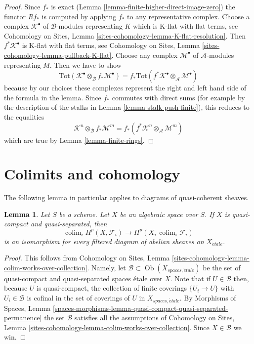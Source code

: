 \documentclass{stacks-project}
\theoremstyle{plain}
\newtheorem{lemma}[subsection]{Lemma}
\theoremstyle{definition}
\theoremstyle{remark}
\numberwithin{equation}{subsection}
\def\colim{\mathop{\mathrm{colim}}\nolimits}
\def\Ob{\mathop{\mathrm{Ob}}\nolimits}
\def\etale{{\acute{e}tale}}
\begin{document}
\begin{proof}
Since $f_*$ is exact (Lemma \ref{lemma-finite-higher-direct-image-zero})
the functor $Rf_*$ is computed by applying $f_*$ to any representative complex.
Choose a complex $\mathcal{K}^\bullet$ of $\mathcal{B}$-modules
representing $K$ which is K-flat with flat terms, see
Cohomology on Sites, Lemma \ref{sites-cohomology-lemma-K-flat-resolution}.
Then $f^*\mathcal{K}^\bullet$ is K-flat with flat terms, see
Cohomology on Sites, Lemma \ref{sites-cohomology-lemma-pullback-K-flat}.
Choose any complex $\mathcal{M}^\bullet$ of $\mathcal{A}$-modules
representing $M$. Then
we have to show
$$
\text{Tot}(\mathcal{K}^\bullet \otimes_\mathcal{B} f_*\mathcal{M}^\bullet)
=
f_*\text{Tot}(f^*\mathcal{K}^\bullet \otimes_\mathcal{A} \mathcal{M}^\bullet)
$$
because by our choices these complexes represent the right and left hand
side of the formula in the lemma.
Since $f_*$ commutes with direct sums
(for example by the description of the stalks in
Lemma \ref{lemma-stalk-push-finite}),
this reduces to the equalities
$$
\mathcal{K}^n \otimes_\mathcal{B} f_*\mathcal{M}^m
=
f_*(f^*\mathcal{K}^n \otimes_\mathcal{A} \mathcal{M}^m)
$$
which are true by Lemma \ref{lemma-finite-rings}.
\end{proof}









\section{Colimits and cohomology}
\label{section-colimits}

\noindent
The following lemma in particular applies to diagrams of quasi-coherent
sheaves.

\begin{lemma}
\label{lemma-colimits}
Let $S$ be a scheme. Let $X$ be an algebraic space over $S$.
If $X$ is quasi-compact and quasi-separated, then
$$
\colim_i H^p(X, \mathcal{F}_i)
\longrightarrow
H^p(X, \colim_i \mathcal{F}_i)
$$
is an isomorphism
for every filtered diagram of abelian sheaves on $X_\etale$.
\end{lemma}

\begin{proof}
This follows from
Cohomology on Sites, Lemma
\ref{sites-cohomology-lemma-colim-works-over-collection}.
Namely, let $\mathcal{B} \subset \Ob(X_{spaces, \etale})$
be the set of quasi-compact and quasi-separated spaces \'etale over $X$.
Note that if $U \in \mathcal{B}$ then, because $U$ is quasi-compact,
the collection of finite coverings $\{U_i \to U\}$ with $U_i \in \mathcal{B}$
is cofinal in the set of coverings of $U$ in $X_{spaces, \etale}$. By
Morphisms of Spaces, Lemma
\ref{spaces-morphisms-lemma-quasi-compact-quasi-separated-permanence}
the set $\mathcal{B}$ satisfies all the assumptions of
Cohomology on Sites, Lemma
\ref{sites-cohomology-lemma-colim-works-over-collection}.
Since $X \in \mathcal{B}$ we win.
\end{proof}
\end{document}
